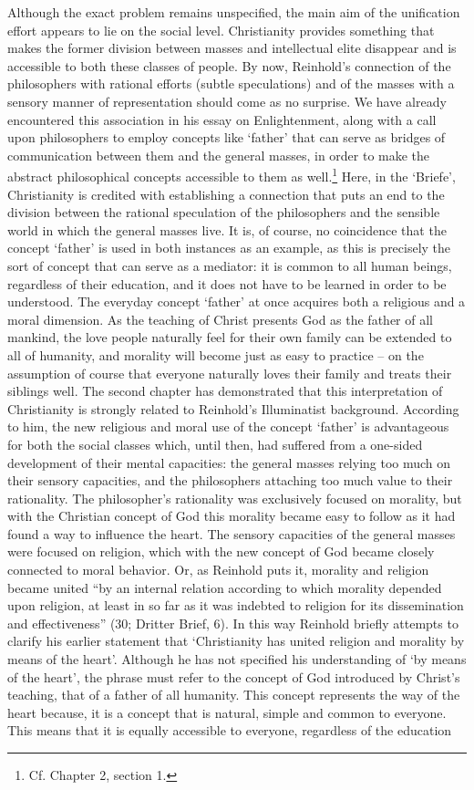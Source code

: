 Although the exact problem remains unspecified, the main aim of the unification effort appears to lie on the social level. Christianity provides something that makes the former division between masses and intellectual elite disappear and is accessible to both these classes of people. By now, Reinhold's connection of the philosophers with rational efforts (subtle speculations) and of the masses with a sensory manner of representation should come as no surprise. We have already encountered this association in his essay on Enlightenment, along with a call upon philosophers to employ concepts like `father' that can serve as bridges of communication between them and the general masses, in order to make the abstract philosophical concepts accessible to them as well.\footnote{ Cf. Chapter 2, section 1.} Here, in the `Briefe', Christianity is credited with establishing a connection that puts an end to the division between the rational speculation of the philosophers and the sensible world in which the general masses live. It is, of course, no coincidence that the concept `father' is used in both instances as an example, as this is precisely the sort of concept that can serve as a mediator: it is common to all human beings, regardless of their education, and it does not have to be learned in order to be understood. The everyday concept `father' at once acquires both a religious and a moral dimension. As the teaching of Christ presents God as the father of all mankind, the love people naturally feel for their own family can be extended to all of humanity, and morality will become just as easy to practice {--} on the assumption of course that everyone naturally loves their family and treats their siblings well. The second chapter has demonstrated that this interpretation of Christianity is strongly related to Reinhold's Illuminatist background. According to him, the new religious and moral use of the concept `father' is advantageous for both the social classes which, until then, had suffered from a one{-}sided development of their mental capacities: the general masses relying too much on their sensory capacities, and the philosophers attaching too much value to their rationality. The philosopher's rationality was exclusively focused on morality, but with the Christian concept of God this morality became easy to follow as it had found a way to influence the heart. The sensory capacities of the general masses were focused on religion, which with the new concept of God became closely connected to moral behavior. Or, as Reinhold puts it, morality and religion became united ``by an internal relation according to which morality depended upon religion, at least in so far as it was indebted to religion for its dissemination and effectiveness'' (30; Dritter Brief, 6). In this way Reinhold briefly attempts to clarify his earlier statement that `Christianity has united religion and morality by means of the heart'. Although he has not specified his understanding of `by means of the heart', the phrase must refer to the concept of God introduced by Christ's teaching, that of a father of all humanity. This concept represents the way of the heart because, it is a concept that is natural, simple and common to everyone. This means that it is equally accessible to everyone, regardless of the education 